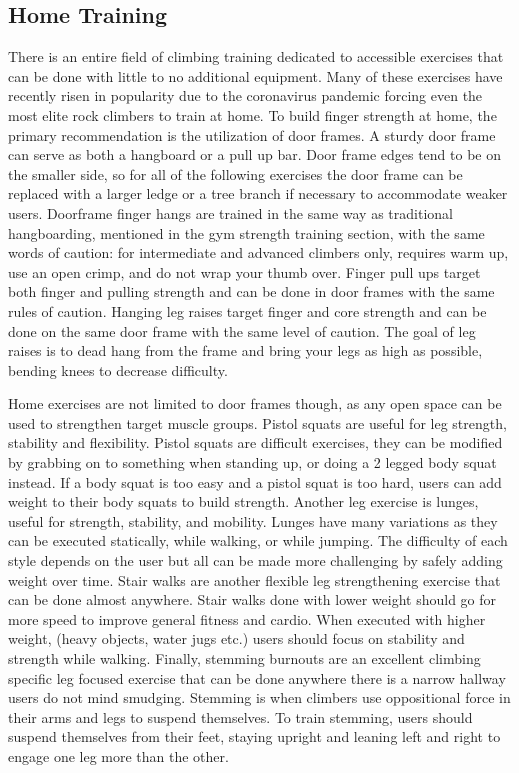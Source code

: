 \documentclass[10pt,twocolumn]{article}
\begin{document}
\subsection{Home Training}

	There is an entire field of climbing training dedicated to accessible exercises that can be done with little to no additional equipment. Many of these exercises have recently risen in popularity due to the coronavirus pandemic forcing even the most elite rock climbers to train at home. 
	To build finger strength at home, the primary recommendation is the utilization of door frames. A sturdy door frame can serve as both a hangboard or a pull up bar. Door frame edges tend to be on the smaller side, so for all of the following exercises the door frame can be replaced with a larger ledge or a tree branch if necessary to accommodate weaker users. Doorframe finger hangs are trained in the same way as traditional hangboarding, mentioned in the gym strength training section, with the same words of caution: for intermediate and advanced climbers only, requires warm up, use an open crimp, and do not wrap your thumb over. Finger pull ups target both finger and pulling strength and can be done in door frames with the same rules of caution. Hanging leg raises target finger and core strength and can be done on the same door frame with the same level of caution. The goal of leg raises is to dead hang from the frame and bring your legs as high as possible, bending knees to decrease difficulty. \cite{ward_training_2016}
	
	Home exercises are not limited to door frames though, as any open space can be used to strengthen target muscle groups. Pistol squats are useful for leg strength, stability and flexibility. Pistol squats are difficult exercises, they can be modified by grabbing on to something when standing up, or doing a 2 legged body squat instead. If a body squat is too easy and a pistol squat is too hard, users can add weight to their body squats to build strength. Another leg exercise is lunges, useful for strength, stability, and mobility. Lunges have many variations as they can be executed statically, while walking, or while jumping. The difficulty of each style depends on the user but all can be made more challenging by safely adding weight over time. Stair walks are another flexible leg strengthening exercise that can be done almost anywhere. Stair walks done with lower weight should go for more speed to improve general fitness and cardio. When executed with higher weight, (heavy objects, water jugs etc.) users should focus on stability and strength while walking. Finally, stemming burnouts are an excellent climbing specific leg focused exercise that can be done anywhere there is a narrow hallway users do not mind smudging. Stemming is when climbers use oppositional force in their arms and legs to suspend themselves. To train stemming, users should suspend themselves from their feet, staying upright and leaning left and right to engage one leg more than the other. \cite{ward_training_2016} 
\end{document}

